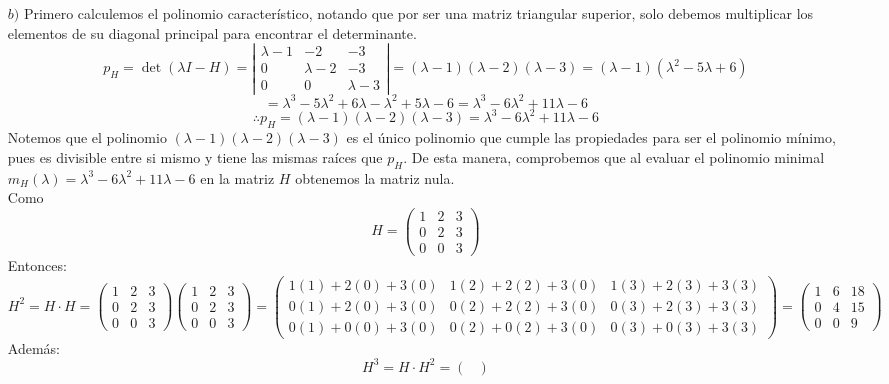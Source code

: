 \begin{enumerate}
\item[$b)$] Primero calculemos el polinomio característico, notando que por ser una matriz triangular superior, solo debemos multiplicar los elementos de su diagonal principal para encontrar el determinante.
\[ p_H=\det( \lambda I-H)= \left| \begin{array}{ccc}	
\lambda-1 & -2 & -3\\
0 & \lambda -2 & -3\\
0 & 0 & \lambda - 3 \end{array} \right| =(\lambda -1)(\lambda -2)(\lambda -3)=(\lambda-1)(\lambda^2-5\lambda+6)\]\[=\lambda^3-5\lambda^2+6\lambda-\lambda^2+5\lambda-6=\lambda ^3-6\lambda ^2+11\lambda -6\] \[\therefore p_H = (\lambda -1)(\lambda -2)(\lambda -3)=\lambda ^3-6\lambda ^2+11\lambda -6\]
Notemos que el polinomio $(\lambda -1)(\lambda -2)(\lambda -3)$ es el único polinomio que cumple las propiedades para ser el polinomio mínimo, pues es divisible entre si mismo y tiene las mismas ra\'ices que $p_H$. De esta manera, comprobemos que al evaluar el polinomio minimal $m_H(\lambda) = \lambda ^3-6\lambda ^2+11\lambda -6$ en la matriz $H$ obtenemos la matriz nula.\\Como
\[H = \begin{pmatrix}
	1 & 2 & 3 \\
	0 & 2 & 3 \\
	0 & 0 & 3\end{pmatrix}\]
Entonces:
\[H^2=H\cdot H=\begin{pmatrix}
	1 & 2 & 3 \\
	0 & 2 & 3 \\
	0 & 0 & 3\end{pmatrix}\begin{pmatrix}
	1 & 2 & 3 \\
	0 & 2 & 3 \\
	0 & 0 & 3\end{pmatrix}=\begin{pmatrix}
	1(1)+2(0)+3(0) & 1(2)+2(2)+3(0) & 1(3)+2(3)+3(3) \\
	0(1)+2(0)+3(0) & 0(2)+2(2)+3(0) & 0(3)+2(3)+3(3) \\
	0(1)+0(0)+3(0) & 0(2)+0(2)+3(0) & 0(3)+0(3)+3(3) 
	\end{pmatrix}=\begin{pmatrix}
	1 & 6 & 18 \\
	0 & 4 & 15 \\
	0 & 0 & 9\end{pmatrix}\]
Además:
\[H^3=H\cdot H^2=\begin{pmatrix}

\end{pmatrix}\]
\end{enumerate}
